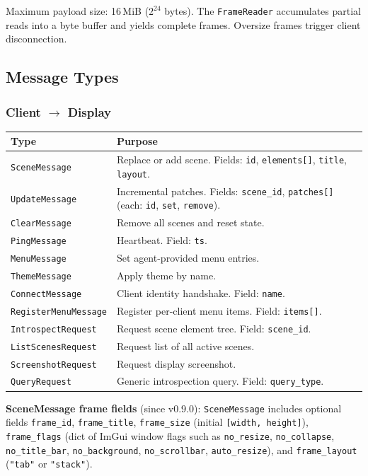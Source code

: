 \documentclass[a4paper,10pt]{article}
\newcommand{\msg}[1]{\texttt{#1}}
\newcommand{\field}[1]{\texttt{#1}}
\begin{document}
Maximum payload size: 16\,MiB ($2^{24}$ bytes).  The
\texttt{FrameReader} accumulates partial reads into a byte buffer
and yields complete frames.  Oversize frames trigger client
disconnection.

\subsection{Message Types}

\subsubsection{Client $\to$ Display}

\begin{center}
\begin{tabular}{lp{9cm}}
\toprule
\textbf{Type} & \textbf{Purpose} \\
\midrule
\msg{SceneMessage}  & Replace or add scene.  Fields: \field{id},
  \field{elements[]}, \field{title}, \field{layout}. \\
\msg{UpdateMessage} & Incremental patches.  Fields: \field{scene\_id},
  \field{patches[]} (each: \field{id}, \field{set}, \field{remove}). \\
\msg{ClearMessage}  & Remove all scenes and reset state. \\
\msg{PingMessage}   & Heartbeat.  Field: \field{ts}. \\
\msg{MenuMessage}   & Set agent-provided menu entries. \\
\msg{ThemeMessage}   & Apply theme by name. \\
\msg{ConnectMessage} & Client identity handshake.  Field: \field{name}. \\
\msg{RegisterMenuMessage} & Register per-client menu items.
  Field: \field{items[]}. \\
\msg{IntrospectRequest} & Request scene element tree.
  Field: \field{scene\_id}. \\
\msg{ListScenesRequest} & Request list of all active scenes. \\
\msg{ScreenshotRequest} & Request display screenshot. \\
\msg{QueryRequest} & Generic introspection query.
  Field: \field{query\_type}. \\
\bottomrule
\end{tabular}
\end{center}

\textbf{SceneMessage frame fields} (since v0.9.0): \msg{SceneMessage}
includes optional fields \field{frame\_id}, \field{frame\_title},
\field{frame\_size} (initial \texttt{[width, height]}),
\field{frame\_flags} (dict of ImGui window flags such as
\texttt{no\_resize}, \texttt{no\_collapse}, \texttt{no\_title\_bar},
\texttt{no\_background}, \texttt{no\_scrollbar}, \texttt{auto\_resize}),
and \field{frame\_layout} (\texttt{"tab"} or \texttt{"stack"}).
\end{document}
